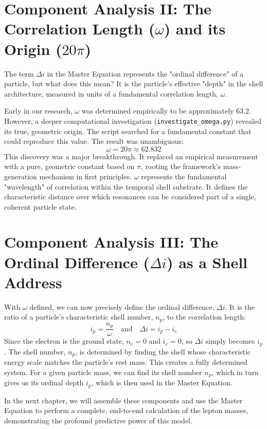 \documentclass[12pt]{report}
\begin{document}
\section{Component Analysis II: The Correlation Length (\texorpdfstring{$\omega$}{ω}) and its Origin (\texorpdfstring{$20\pi$}{20π})}
The term $\Delta i$ in the Master Equation represents the "ordinal difference" of a particle, but what does this mean? It is the particle's effective "depth" in the shell architecture, measured in units of a fundamental correlation length, $\omega$.

Early in our research, $\omega$ was determined empirically to be approximately 63.2. However, a deeper computational investigation (\texttt{investigate\_omega.py}) revealed its true, geometric origin. The script searched for a fundamental constant that could reproduce this value. The result was unambiguous:
\begin{equation}
\omega = 20\pi \approx 62.832
\end{equation}
This discovery was a major breakthrough. It replaced an empirical measurement with a pure, geometric constant based on $\pi$, rooting the framework's mass-generation mechanism in first principles. $\omega$ represents the fundamental "wavelength" of correlation within the temporal shell substrate. It defines the characteristic distance over which resonances can be considered part of a single, coherent particle state.

\section{Component Analysis III: The Ordinal Difference (\texorpdfstring{$\Delta i$}{Δi}) as a Shell Address}
With $\omega$ defined, we can now precisely define the ordinal difference, $\Delta i$. It is the ratio of a particle's characteristic shell number, $n_p$, to the correlation length:
\begin{equation}
i_p = \frac{n_p}{\omega} \quad \text{and} \quad \Delta i = i_p - i_e
\end{equation}
Since the electron is the ground state, $n_e = 0$ and $i_e = 0$, so $\Delta i$ simply becomes $i_p$. The shell number, $n_p$, is determined by finding the shell whose characteristic energy scale matches the particle's rest mass. This creates a fully determined system. For a given particle mass, we can find its shell number $n_p$, which in turn gives us its ordinal depth $i_p$, which is then used in the Master Equation.

In the next chapter, we will assemble these components and use the Master Equation to perform a complete, end-to-end calculation of the lepton masses, demonstrating the profound predictive power of this model.
\end{document}
